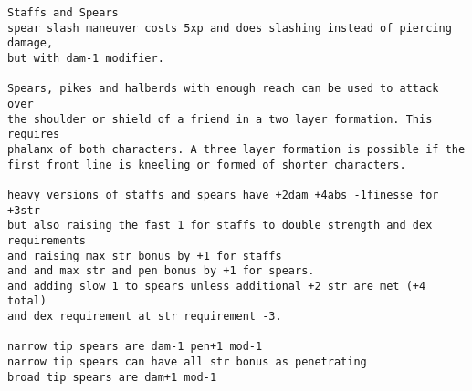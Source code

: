 \goodbreak \small \begin{samepage} \begin{verbatim}
Staffs and Spears
spear slash maneuver costs 5xp and does slashing instead of piercing damage,
but with dam-1 modifier.

Spears, pikes and halberds with enough reach can be used to attack over
the shoulder or shield of a friend in a two layer formation. This requires
phalanx of both characters. A three layer formation is possible if the
first front line is kneeling or formed of shorter characters.

heavy versions of staffs and spears have +2dam +4abs -1finesse for +3str
but also raising the fast 1 for staffs to double strength and dex requirements
and raising max str bonus by +1 for staffs
and and max str and pen bonus by +1 for spears.
and adding slow 1 to spears unless additional +2 str are met (+4 total)
and dex requirement at str requirement -3.

narrow tip spears are dam-1 pen+1 mod-1
narrow tip spears can have all str bonus as penetrating
broad tip spears are dam+1 mod-1


\end{verbatim}
\end{samepage}

